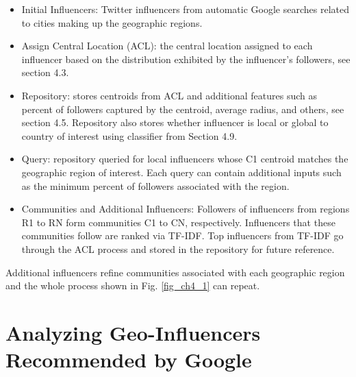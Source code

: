 \begin{itemize}
\item Initial Influencers: Twitter influencers from automatic Google searches related to cities making up the geographic regions.

\item Assign Central Location (ACL): the central location assigned to each influencer based on the distribution exhibited by the influencer's followers, see section 4.3. 

\item Repository: stores centroids from ACL and additional features such as percent of followers captured by the centroid, average radius, and others, see section 4.5. Repository also stores whether influencer is local or global to country of interest using classifier from Section 4.9.

\item Query: repository queried for local influencers whose C1 centroid matches the geographic region of interest. Each query can contain additional inputs such as the minimum percent of followers associated with the region. 

\item Communities and Additional Influencers: Followers of influencers from regions R1 to RN form communities C1 to CN, respectively. Influencers that these communities follow are ranked via TF-IDF. Top influencers from TF-IDF go through the ACL process and stored in the repository for future reference. 
\end{itemize}

Additional influencers refine communities associated with each geographic region and the whole process shown in Fig. \ref{fig_ch4_1} can repeat. %

\section{Analyzing Geo-Influencers Recommended by Google}



